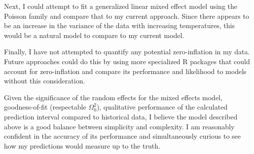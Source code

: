\documentclass[11pt]{article}
\begin{document}
Next, I could attempt to fit a generalized linear mixed effect model using the Poisson family and compare that to my current approach. Since there appears to be an increase in the variance of the data with increasing temperatures, this would be a natural model to compare to my current model.

Finally, I have not attempted to quantify any potential zero-inflation in my data. Future approaches could do this by using more specialized R packages that could account for zero-inflation and compare its performance and likelihood to models without this consideration.

Given the significance of the random effects for the mixed effects model, goodness-of-fit (respectable $\Omega_0^2$), qualitative performance of the calculated prediction interval compared to historical data, I believe the model described above is a good balance between simplicity and complexity. I am reasonably confident in the accuracy of its performance and simultaneously curious to see how my predictions would measure up to the truth.



% 

%
\end{document}

